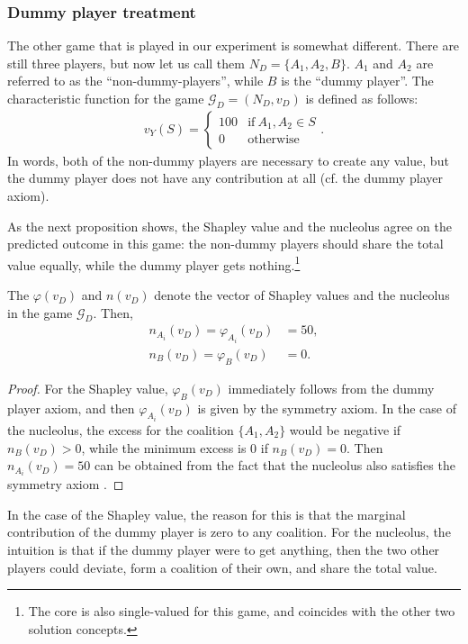 \subsubsection{Dummy player treatment} \label{explanation_dummy_player_treatment}

The other game that is played in our experiment is somewhat different. There are still three players, but now let us call them $N_D = \{A_1, A_2, B\}$. $A_1$ and $A_2$ are referred to as the ``non-dummy-players'', while $B$ is the ``dummy player''. The characteristic function for the game $\mathcal{G}_D = (N_D, v_D)$ is defined as follows:
\begin{align*}
    v_Y(S) = \begin{cases}
        100 & \text{if}\ A_1, A_2 \in S \\
        0 & \text{otherwise}
    \end{cases}.
\end{align*}
In words, both of the non-dummy players are necessary to create any value, but the dummy player does not have any contribution at all (cf. the dummy player axiom).

As the next proposition shows, the Shapley value and the nucleolus agree on the predicted outcome in this game: the non-dummy players should share the total value equally, while the dummy player gets nothing.\footnote{The core is also single-valued for this game, and coincides with the other two solution concepts.}
\begin{proposition}
    \label{prop:dummy_player}
    The $\varphi(v_D)$ and $n(v_D)$ denote the vector of Shapley values and the nucleolus in the game $\mathcal{G}_D$. Then,
    \begin{align*}
        n_{A_i}(v_D) = \varphi_{A_i}(v_D) &= 50, \\
        n_{B}(v_D) = \varphi_{B}(v_D) &= 0.
    \end{align*}
\end{proposition}
\begin{proof}
    For the Shapley value, $\varphi_{B}(v_D)$ immediately follows from the dummy player axiom, and then $\varphi_{A_i}(v_D)$ is given by the symmetry axiom. In the case of the nucleolus, the excess for the coalition $\{A_1, A_2\}$ would be negative if $n_{B}(v_D) > 0$, while the minimum excess is 0 if $n_{B}(v_D) = 0$. Then $n_{A_i}(v_D) = 50$ can be obtained from the fact that the nucleolus also satisfies the symmetry axiom \parencite{snijders1995axiomatization}.
\end{proof}
In the case of the Shapley value, the reason for this is that the marginal contribution of the dummy player is zero to any coalition. For the nucleolus, the intuition is that if the dummy player were to get anything, then the two other players could deviate, form a coalition of their own, and share the total value.


